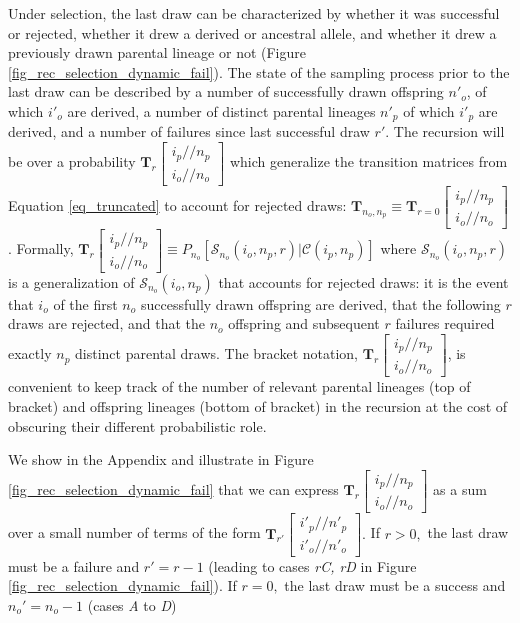 \documentclass[9pt,twocolumn,twoside,lineno]{gsajnl}
\newcommand{\dslash}{/\!\!/}
\newcommand{\Coalc}[4]{\begin{bmatrix}#1\dslash #2 \\ #3\dslash #4 \end{bmatrix}}
\newcommand{\ms}{\mathcal{S}}
\begin{document}
Under selection, the last draw can be characterized by whether it was successful or rejected,
whether it drew a derived or ancestral allele, and whether it drew a previously drawn parental
lineage or not (Figure \ref{fig_rec_selection_dynamic_fail}).  The state of the sampling process
prior to the last draw can be described by a number of successfully drawn offspring $n'_o$, of which
$i'_o$ are derived, a number of distinct parental lineages $n'_p$ of which $i'_p$ are derived, and a
number of failures since last successful draw $r'$.  The recursion will be over a probability
$\mathbf{T}_{r}\Coalc{i_p}{n_p}{i_o}{n_o}$ which generalize the transition matrices from Equation
\eqref{eq_truncated} to account for rejected draws: $\mathbf{T}_{n_o,n_p}\equiv
\mathbf{T}_{r=0}\Coalc{i_p}{n_p}{i_o}{n_o}$. Formally,  $\mathbf{T}_{r}\Coalc{i_p}{n_p}{i_o}{n_o}
\equiv P_{n_o}\left[\ms_{n_o}(i_o, n_p, r) | \mathcal{C}(i_p, n_p)\right]$ where $\ms_{n_o}(i_o,
n_p, r)$ is a generalization of  $\ms_{n_o}(i_o, n_p)$ that accounts for rejected draws: it is the
event that $i_o$ of the first $n_o$ successfully drawn offspring are derived, that the following $r$
draws are rejected, and that the $n_o$ offspring and subsequent $r$ failures required exactly $n_p$
distinct parental draws.  The bracket notation, $\mathbf{T}_{r}\Coalc{i_p}{n_p}{i_o}{n_o}$, is
convenient to keep track of the number of relevant parental lineages (top of bracket) and offspring
lineages (bottom of bracket) in the recursion at the cost of obscuring their different probabilistic
role.

We show in the Appendix and illustrate in Figure \ref{fig_rec_selection_dynamic_fail}  that we
can express $\mathbf{T}_{r}\Coalc{i_p}{n_p}{i_o}{n_o}$ as a sum over a small number of terms
of the form $\mathbf{T}_{r'}\Coalc{i'_p}{n'_p}{i'_o}{n'_o}.$ If $r>0,$ the last draw must be a failure
and $r' = r - 1$ (leading to cases \textit{rC, rD} in Figure \ref{fig_rec_selection_dynamic_fail}).
If $r=0,$ the last draw must be a success and $n_o' = n_o-1$ (cases \textit{A} to \textit{D})

\end{document}
